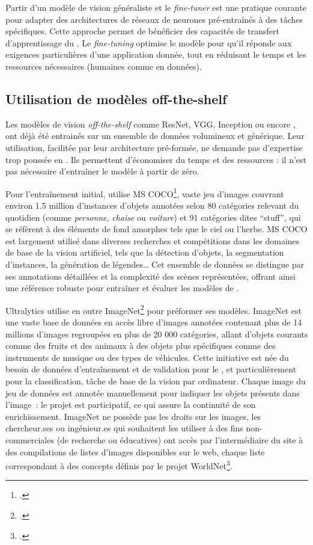 Partir d'un modèle de vision généraliste et le \textit{fine-tuner} est une
pratique courante pour adapter des architectures de réseaux de neurones
pré-entraînés à des tâches spécifiques. Cette approche permet de
bénéficier des capacités de transfert d'apprentissage du
\ml. Le \textit{fine-tuning} optimise le modèle pour qu'il réponde
aux exigences particulières d'une application donnée, tout en réduisant
le temps et les ressources nécessaires (humaines comme en données).

\hypertarget{modeles-off-the-shelf}{%
\subsection{Utilisation de modèles
off-the-shelf}\label{modeles-off-the-shelf}}

Les modèles de vision \textit{off-the-shelf} comme ResNet, VGG, Inception ou
encore \yolov, ont déjà été entrainés sur un ensemble de données
volumineux et générique. Leur utilisation, facilitée par leur
architecture pré-formée, ne demande pas d'expertise trop poussée en
\ml. Ils permettent d'économiser du temps et des ressources
: il n'est pas nécessaire d'entraîner le modèle à partir de zéro.

Pour l'entraînement initial, \yolov utilise MS COCO\footcite{noauthor_coco_nodate}, vaste jeu
d'images couvrant environ 1.5 million d'instances d'objets annotées
selon 80 catégories relevant du quotidien (comme \emph{personne},
\emph{chaise} ou \emph{voiture}) et 91 catégories dites ``stuff'', qui
se réfèrent à des éléments de fond amorphes tels que le ciel ou l'herbe.
MS COCO est largement utilisé dans diverses recherches et compétitions
dans les domaines de base de la vision artificiel, tels que la détection
d'objets, la segmentation d'instances, la génération de légendes\ldots{}
Cet ensemble de données se distingue par ses annotations détaillées et
la complexité des scènes représentées, offrant ainsi une référence
robuste pour entraîner et évaluer les modèles de \dl.

Ultralytics utilise en outre ImageNet\footcite{noauthor_imagenet_nodate} pour
préformer ses modèles. ImageNet est une vaste base de données en accès
libre d'images annotées contenant plus de 14 millions d'images
regroupées en plus de 20 000 catégories, allant d'objets courants comme
des fruits et des animaux à des objets plus spécifiques comme des
instruments de musique ou des types de véhicules. Cette initiative est
née du besoin de données d'entraînement et de validation pour le \ml, et particulièrement pour la classification, tâche de base de
la vision par ordinateur. Chaque image du jeu de données est annotée
manuellement pour indiquer les objets présents dans l'image~: le projet
est participatif, ce qui assure la continuité de son enrichissement.
ImageNet ne possède pas les droits sur les images, les chercheur.ses ou
ingénieur.es qui souhaitent les utiliser à des fins
non-commerciales (de recherche ou éducatives) ont accès par
l'intermédiaire du site à des compilations de listes d'images
disponibles sur le web, chaque liste correspondant à des concepts
définis par le projet WorldNet\footcite{noauthor_wordnet_nodate}.

